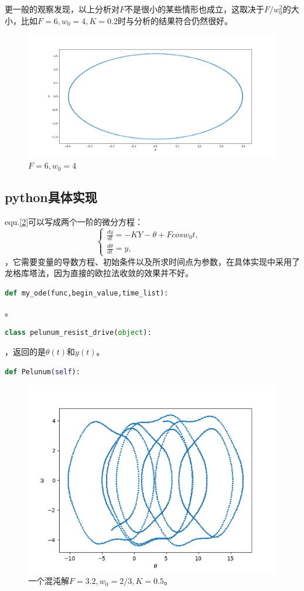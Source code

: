 \documentclass[UTF8]{ctexart}
\begin{document}
更一般的观察发现，以上分析对$F$不是很小的某些情形也成立，这取决于$F/w_0^2$的大小，比如$F=6,w_0=4,K=0.2$时与分析的结果符合仍然很好。
\begin{figure}[H]
	\centering
	\includegraphics[width=0.7\linewidth]{F_1.png}
	\caption{$F=6,w_0=4$}
\end{figure}
\subsection{python具体实现}
equ.\ref{2}可以写成两个一阶的微分方程：
\begin{equation}
\left\{
\begin{array}{lr}
\frac{dy}{dt}=-KY-\theta+Fcosw_0t,& \\
\frac{d\theta}{dt}=y,
\end{array}
\right.
\end{equation}
，它需要变量的导数方程、初始条件以及所求时间点为参数，在具体实现中采用了龙格库塔法，因为直接的欧拉法收敛的效果并不好。
\begin{lstlisting}[language=Python]
def my_ode(func,begin_value,time_list):
\end{lstlisting}
。
\begin{lstlisting}[language=Python]
class pelunum_resist_drive(object):
\end{lstlisting}
，返回的是$\theta(t)$和$y(t)$。
\begin{lstlisting}[language=Python]
def Pelunum(self):
\end{lstlisting}
\begin{figure}[H]
	\centering
	\includegraphics[width=0.7\linewidth]{mess.png}
	\caption{一个混沌解$F=3.2,w_0=2/3,K=0.5$。}
\end{figure}
\end{document}
